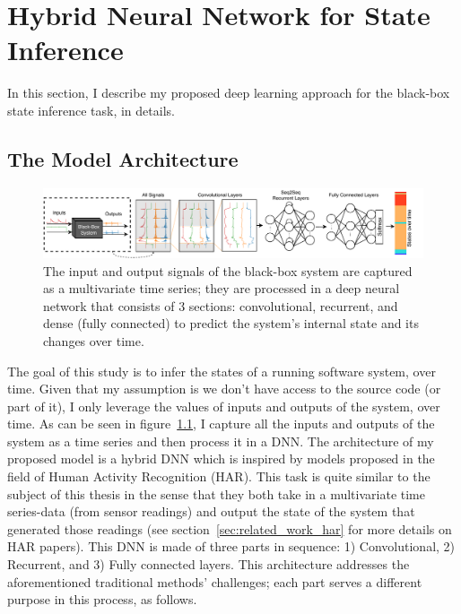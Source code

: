 \chapter{Hybrid Neural Network for State Inference} \label{sec:approach}
In this section, I describe my proposed deep learning approach for the black-box state inference task, in details. 

\section{The Model Architecture}
\begin{figure}
    \centering
    \includegraphics[width=\textwidth]{ASE_files/GeneralConvolutionalNet.pdf}
    \caption{The input and output signals of the black-box system are captured as a multivariate time series; they are processed in a deep neural network that consists of 3 sections: convolutional, recurrent, and dense (fully connected) to predict the system's internal state and its changes over time.}
    \label{fig:general_net}
\end{figure}

The goal of this study is to infer the states of a running software system, over time. Given that my assumption is we don't have access to the source code (or part of it), I only leverage the values of inputs and outputs of the system, over time. 
As can be seen in figure~\ref{fig:general_net}, I capture all the inputs and outputs of the system as a time series and then process it in a DNN. 
The architecture of my proposed model is a hybrid DNN which is inspired by models proposed in the field of Human Activity Recognition (HAR). This task is quite similar to the subject of this thesis in the sense that they both take in a multivariate time series-data (from sensor readings) and output the state of the system that generated those readings (see section~\ref{sec:related_work_har} for more details on HAR papers). 
This DNN is made of three parts in sequence: 1) Convolutional, 2) Recurrent, and 3) Fully connected layers. This architecture addresses the aforementioned traditional methods' challenges; each part serves a different purpose in this process, as follows.


